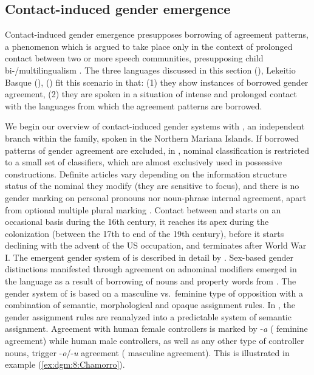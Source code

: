 \documentclass[output=collectionpaper]{langsci/langscibook}
\begin{document}
\subsection{Contact-induced gender emergence}
Contact-induced gender emergence presupposes borrowing of agreement patterns, a phenomenon which is argued to take place only in the context of prolonged contact between two or more speech communities, presupposing child bi-/multilingualism \citep{Thomason1992,Thomason2001,Trudgill2011}. The three languages discussed in this section \textendash{}  (), Lekeitio Basque (),  () \textendash{} fit this scenario in that: (1) they show instances of borrowed gender agreement, (2) they are spoken in a situation of intense and prolonged contact with the languages from which the agreement patterns are borrowed.


We begin our overview of contact-induced gender systems with , an independent branch within the  family, spoken in the Northern Mariana Islands. If borrowed patterns of gender agreement are excluded, in  , nominal classification is restricted to a small set of classifiers, which are almost exclusively used in possessive constructions. Definite articles vary depending on the information structure status of the nominal they modify (they are sensitive to focus), and there is no gender marking on personal pronouns nor noun-phrase internal agreement, apart from optional multiple plural marking \citep[111]{Stolz2012}. Contact between  and  starts on an occasional basis during the 16th century, it reaches its apex during the  colonization (between the 17th to end of the 19th century), before it starts declining with the advent of the US occupation, and terminates after World War I. The emergent gender system of  is described in detail by \citet{Stolz2012}. Sex-based gender distinctions manifested through agreement on adnominal modifiers emerged in the language as a result of borrowing of nouns and property words from . The gender system of  is based on a masculine vs.\ feminine type of opposition with a combination of semantic, morphological and opaque assignment rules. In , the  gender assignment rules are reanalyzed into a predictable system of semantic assignment. Agreement with human female controllers is marked by -\textit{a} ( feminine agreement)  while human male controllers, as well as any other type of controller nouns, trigger  -\textit{o}/-\textit{u} agreement ( masculine agreement). This is illustrated in example (\ref{ex:dgm:8:Chamorro}).
\end{document}
